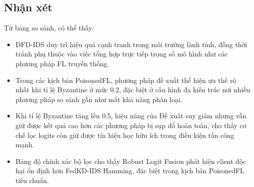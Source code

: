 
\subsection{Nhận xét}
Từ bảng so sánh, có thể thấy:

\begin{itemize}
    \item DFD-IDS duy trì hiệu quả cạnh tranh trong môi trường lành tính, đồng thời tránh phụ thuộc vào việc tổng hợp trực tiếp trọng số mô hình như các phương pháp FL truyền thống.
    \item Trong các kịch bản PoisonedFL, phương pháp đề xuất thể hiện ưu thế rõ nhất khi tỉ lệ Byzantine ở mức 0.2, đặc biệt ở cấu hình đa kiến trúc nơi nhiều phương pháp so sánh gần như mất khả năng phân loại.
    \item Khi tỉ lệ Byzantine tăng lên 0.5, hiệu năng của Đề xuất suy giảm nhưng vẫn giữ được kết quả cao hơn các phương pháp bị sụp đổ hoàn toàn, cho thấy cơ chế lọc logits còn giữ được tín hiệu học hữu ích trong điều kiện tấn công mạnh.
    \item Bảng độ chính xác bộ lọc cho thấy Robust Logit Fusion phát hiện client độc hại ổn định hơn FedKD-IDS Hamming, đặc biệt trong kịch bản PoisonedFL tiêu chuẩn.
\end{itemize}

\pagebreak
